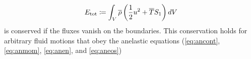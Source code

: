 \documentclass[12pt]{article}
\begin{document}
\begin{align}
	E_{\rm tot} \coloneqq \int_V \overline{\rho}\left(\frac{1}{2} u^2 + \overline{T} S_1\right) dV
\end{align}
is conserved if the fluxes vanish on the boundaries. This conservation holds for arbitrary fluid motions that obey the anelastic equations (\eqref{eq:ancont}, \eqref{eq:anmom}, \eqref{eq:anen}, and \eqref{eq:aneos})
	\newpage
		
\end{document}
